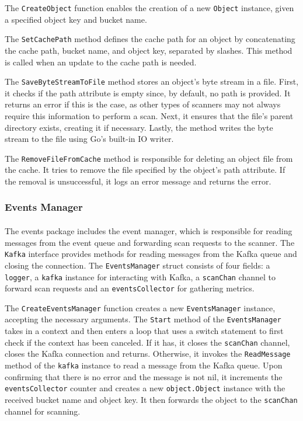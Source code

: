 \documentclass[12pt, conference, final, a4paper, onecolumn, compsoc]{IEEEtran}
\begin{document}
The \texttt{CreateObject} function enables the creation of a new \texttt{Object}
instance, given a specified object key and bucket name.

The \texttt{SetCachePath} method defines the cache path for an object by
concatenating the cache path, bucket name, and object key, separated by slashes.
This method is called when an update to the cache path is needed.

The \texttt{SaveByteStreamToFile} method stores an object's byte stream in a
file. First, it checks if the path attribute is empty since, by default, no path
is provided. It returns an error if this is the case, as other types of scanners
may not always require this information to perform a scan. Next, it ensures that
the file's parent directory exists, creating it if necessary. Lastly, the method
writes the byte stream to the file using Go's built-in IO writer.

The \texttt{RemoveFileFromCache} method is responsible for deleting an object
file from the cache. It tries to remove the file specified by the object's path
attribute. If the removal is unsuccessful, it logs an error message and returns
the error.

\subsubsection*{Events Manager}
\paragraph{}
The events package includes the event manager, which is responsible for reading
messages from the event queue and forwarding scan requests to the scanner. The
\texttt{Kafka} interface provides methods for reading messages from the Kafka
queue and closing the connection. The \texttt{EventsManager} struct consists of
four fields: a \texttt{logger}, a \texttt{kafka} instance for interacting with
Kafka, a \texttt{scanChan} channel to forward scan requests and an
\texttt{eventsCollector} for gathering metrics.

The \texttt{CreateEventsManager} function creates a new \texttt{EventsManager}
instance, accepting the necessary arguments. The \texttt{Start} method of the
\texttt{EventsManager} takes in a context and then enters a loop that uses a
switch statement to first check if the context has been canceled. If it has, it
closes the \texttt{scanChan} channel, closes the Kafka connection and returns.
Otherwise, it invokes the \texttt{ReadMessage} method of the \texttt{kafka}
instance to read a message from the Kafka queue. Upon confirming that there is
no error and the message is not nil, it increments the \texttt{eventsCollector}
counter and creates a new \texttt{object.Object} instance with the received
bucket name and object key. It then forwards the object to the \texttt{scanChan}
channel for scanning.
\end{document}
